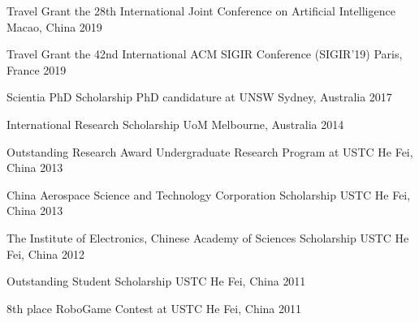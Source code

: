 
\begin{cvhonors}

\cvhonor
    {Travel Grant} %
    {the 28th International Joint Conference on Artificial Intelligence} %
    {Macao, China} %
    {2019} %

\cvhonor
  {Travel Grant}
  {the 42nd International ACM SIGIR Conference (SIGIR'19)}
  {Paris, France}
  {2019}

\cvhonor
  {Scientia PhD Scholarship}
  {PhD candidature at UNSW}
  {Sydney, Australia}
  {2017}

\cvhonor
  {International Research Scholarship}
  {UoM}
  {Melbourne, Australia}
  {2014}

\cvhonor
  {Outstanding Research Award}
  {Undergraduate Research Program at USTC}
  {He Fei, China}
  {2013}

\cvhonor
  {China Aerospace Science and Technology Corporation Scholarship}
  {USTC}
  {He Fei, China}
  {2013}

\cvhonor
  {The Institute of Electronics, Chinese Academy of Sciences Scholarship}
  {USTC}
  {He Fei, China}
  {2012}

\cvhonor
  {Outstanding Student Scholarship}
  {USTC}
  {He Fei, China}
  {2011}

\cvhonor
  {8th place}
  {RoboGame Contest at USTC}
  {He Fei, China}
  {2011}
\end{cvhonors}
